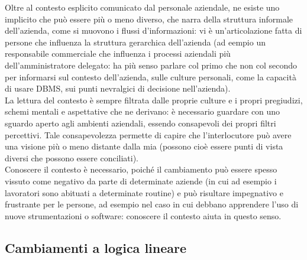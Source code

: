 Oltre al contesto esplicito comunicato dal  personale aziendale, ne esiste uno implicito che pu\`o essere pi\`u o meno diverso, che  narra della struttura informale dell'azienda, come si muovono i flussi d'informazioni: vi \`e un'articolazione fatta di persone che influenza la struttura gerarchica dell'azienda (ad eempio un responsabile  commerciale che influenza i processi aziendali pi\`u dell'amministratore  delegato: ha pi\`u senso parlare col primo che non col secondo per  informarsi sul contesto dell'azienda, sulle culture personali, come la capacit\`a di usare DBMS, sui punti nevralgici di decisione nell'azienda). \\
La  lettura del contesto \`e sempre filtrata dalle proprie culture e i  propri pregiudizi, schemi mentali e aspettative che ne derivano: \`e necessario  guardare con uno sguardo aperto agli ambienti aziendali, essendo consapevoli dei propri filtri percettivi. Tale consapevolezza permette di capire che l'interlocutore  pu\`o avere una visione pi\`u o meno distante dalla mia (possono cio\`e  essere punti di vista diversi che possono essere conciliati). \\
Conoscere il contesto \`e necessario, poich\'e il cambiamento pu\`o essere  spesso vissuto come negativo da parte di determinate aziende (in cui  ad esempio i lavoratori sono abituati a determinate routine) e pu\`o  risultare impegnativo e frustrante per le persone, ad esempio nel caso in cui debbano apprendere l'uso di nuove strumentazioni o software: conoscere il  contesto aiuta in questo senso.\\
\subsection{Cambiamenti a logica lineare}

